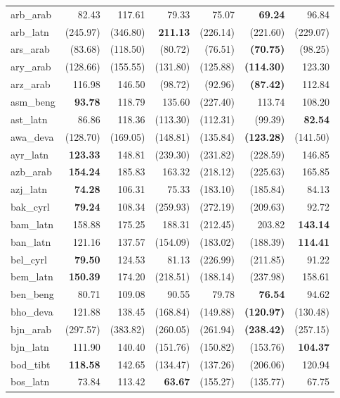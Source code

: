 \documentclass[11pt]{article}
\begin{document}
\begin{center}
\begin{longtable}[width=0.9\textwidth]{|l|rrrrrr|}
arb\_arab & 82.43 & 117.61 & 79.33 & 75.07 & \textbf{69.24} & 96.84 \\ 
arb\_latn & (245.97) & (346.80) & \textbf{211.13} & (226.14) & (221.60) & (229.07) \\ 
ars\_arab & (83.68) & (118.50) & (80.72) & (76.51) & \textbf{(70.75)} & (98.25) \\ 
ary\_arab & (128.66) & (155.55) & (131.80) & (125.88) & \textbf{(114.30)} & 123.30 \\ 
arz\_arab & 116.98 & 146.50 & (98.72) & (92.96) & \textbf{(87.42)} & 112.84 \\ 
asm\_beng & \textbf{93.78} & 118.79 & 135.60 & (227.40) & 113.74 & 108.20 \\ 
ast\_latn & 86.86 & 118.36 & (113.30) & (112.31) & (99.39) & \textbf{82.54} \\ 
awa\_deva & (128.70) & (169.05) & (148.81) & (135.84) & \textbf{(123.28)} & (141.50) \\ 
ayr\_latn & \textbf{123.33} & 148.81 & (239.30) & (231.82) & (228.59) & 146.85 \\ 
azb\_arab & \textbf{154.24} & 185.83 & 163.32 & (218.12) & (225.63) & 165.85 \\ 
azj\_latn & \textbf{74.28} & 106.31 & 75.33 & (183.10) & (185.84) & 84.13 \\ 
bak\_cyrl & \textbf{79.24} & 108.34 & (259.93) & (272.19) & (209.63) & 92.72 \\ 
bam\_latn & 158.88 & 175.25 & 188.31 & (212.45) & 203.82 & \textbf{143.14} \\ 
ban\_latn & 121.16 & 137.57 & (154.09) & (183.02) & (188.39) & \textbf{114.41} \\ 
bel\_cyrl & \textbf{79.50} & 124.53 & 81.13 & (226.99) & (211.85) & 91.22 \\ 
bem\_latn & \textbf{150.39} & 174.20 & (218.51) & (188.14) & (237.98) & 158.61 \\ 
ben\_beng & 80.71 & 109.08 & 90.55 & 79.78 & \textbf{76.54} & 94.62 \\ 
bho\_deva & 121.88 & 138.45 & (168.84) & (149.88) & \textbf{(120.97)} & (130.48) \\ 
bjn\_arab & (297.57) & (383.82) & (260.05) & (261.94) & \textbf{(238.42)} & (257.15) \\ 
bjn\_latn & 111.90 & 140.40 & (151.76) & (150.82) & (153.76) & \textbf{104.37} \\ 
bod\_tibt & \textbf{118.58} & 142.65 & (134.47) & (137.26) & (206.06) & 120.94 \\ 
bos\_latn & 73.84 & 113.42 & \textbf{63.67} & (155.27) & (135.77) & 67.75 \\ 

\end{longtable}
\end{center}
\end{document}
